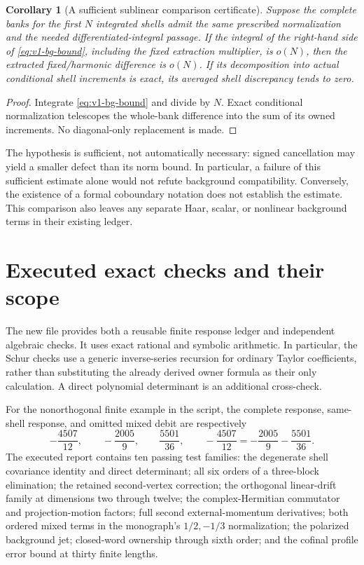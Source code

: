 \documentclass[11pt,a4paper]{article}
\newtheorem{corollary}[corollary]{Corollary}
\theoremstyle{definition}
\theoremstyle{remark}
\begin{document}
\begin{corollary}[A sufficient sublinear comparison certificate]
\label{cor:v1-bg-Cesaro}
Suppose the complete banks for the first $N$ integrated shells admit the
same prescribed normalization and the needed differentiated-integral
passage. If the integral of the right-hand side of
\cref{eq:v1-bg-bound}, including the fixed extraction multiplier, is
$o(N)$, then the extracted fixed/harmonic difference is $o(N)$.
If its decomposition into actual conditional shell increments is exact,
its averaged shell discrepancy tends to zero.
\end{corollary}
\begin{proof}
Integrate \cref{eq:v1-bg-bound} and divide by $N$. Exact conditional
normalization telescopes the whole-bank difference into the sum of its
owned increments. No diagonal-only replacement is made.
\end{proof}

The hypothesis is sufficient, not automatically necessary: signed
cancellation may yield a smaller defect than its norm bound. In
particular, a failure of this sufficient estimate alone would not
refute background compatibility. Conversely, the existence of a
formal coboundary notation does not establish the estimate. This
comparison also leaves any separate Haar, scalar, or nonlinear
background terms in their existing ledger.

\section{Executed exact checks and their scope}
\label{sec:v1-checks}

The new file  provides both a reusable
finite response ledger and independent algebraic checks. It uses exact
rational and symbolic arithmetic. In particular, the Schur checks use a
generic inverse-series recursion for ordinary Taylor coefficients,
rather than substituting the already derived owner formula as their
only calculation. A direct polynomial determinant is an additional
cross-check.

For the nonorthogonal finite example in the script, the complete
response, same-shell response, and omitted mixed debit are respectively
\begin{equation}\label{eq:v1-check-values}
 -\frac{4507}{12},\qquad -\frac{2005}{9},\qquad \frac{5501}{36},
 \qquad
 -\frac{4507}{12}=-\frac{2005}{9}-\frac{5501}{36}.
\end{equation}
The executed report contains ten passing test families: the degenerate
shell covariance identity and direct determinant; all six orders of a
three-block elimination; the retained second-vertex correction; the
orthogonal linear-drift family at dimensions two through twelve; the
complex-Hermitian commutator and projection-motion factors; full second
external-momentum derivatives; both ordered mixed terms in the
monograph's $1/2,-1/3$ normalization; the polarized background jet;
closed-word ownership through sixth order; and the cofinal profile error
bound at thirty finite lengths.
\end{document}
